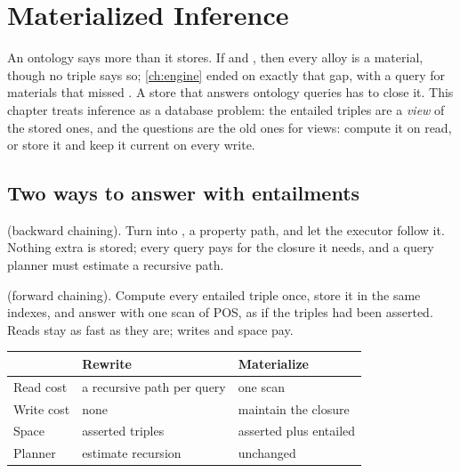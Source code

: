 \chapter{Materialized Inference}
\label{ch:inference}

An ontology says more than it stores. If  and
, then every alloy is a material, though no
triple says so; \cref{ch:engine} ended on exactly that gap, with a query for
materials that missed . A store that answers ontology queries has
to close it. This chapter treats inference as a database problem: the
entailed triples are a \emph{view} of the stored ones, and the questions are
the old ones for views: compute it on read, or store it and keep it current on
every write.

\section{Two ways to answer with entailments}

\begin{description}[leftmargin=1.2em]
\item[Rewrite at read time] (backward chaining). Turn 
into , a property path, and let
the executor follow it. Nothing extra is stored; every query pays for the
closure it needs, and a query planner must estimate a recursive path.
\item[Materialize at write time] (forward chaining). Compute every entailed
triple once, store it in the same indexes, and answer 
with one scan of POS, as if the triples had been asserted. Reads stay as fast
as they are; writes and space pay.
\end{description}

\begin{center}
\begin{tabular}{@{}lll@{}}
\toprule
& Rewrite & Materialize \\
\midrule
Read cost & a recursive path per query & one scan \\
Write cost & none & maintain the closure \\
Space & asserted triples & asserted plus entailed \\
Planner & estimate recursion & unchanged \\
\bottomrule
\end{tabular}
\end{center}

